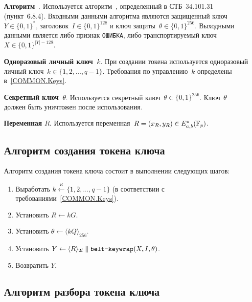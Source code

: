 {\bf Алгоритм~}.
Используется алгоритм~,
определенный в СТБ~34.101.31 (пункт~6.8.4).
Входными данными алгоритма являются
защищенный ключ~$Y\in\{0,1\}^*$,
заголовок~$I\in\{0,1\}^{128}$ 
и ключ защиты~$\theta\in\{0,1\}^{256}$.
%
Выходными данными является
либо признак \texttt{ОШИБКА}, 
либо транспортируемый ключ~$X\in\{0,1\}^{|Y|-128}$.

{\bf Одноразовый личный ключ~$k$}.
При создании токена используется одноразовый личный 
ключ~$k\in\{1,2,\ldots,q-1\}$.
Требования по управлению~$k$ определены в~\ref{COMMON.Keys}.

{\bf Секретный ключ~$\theta$}.
Используется секретный ключ~$\theta\in\{0,1\}^{256}$.
Ключ~$\theta$ должен быть уничтожен после использования.

{\bf Переменная $R$}.
Используется переменная~$R=(x_R,y_R)\in E_{a,b}^*(\mathbb{F}_p)$.

\subsection{Алгоритм создания токена ключа}\label{TRANSPORT.Wrap}

Алгоритм создания токена ключа состоит в выполнении следующих шагов:
\begin{enumerate}
\item
Выработать
$k\stackrel{R}{\leftarrow}\{1,2,\ldots,q-1\}$
(в соответствии с требованиями~\ref{COMMON.Keys}).

\item
Установить $R\leftarrow kG$.

\item
Установить $\theta\leftarrow\langle kQ\rangle_{256}$.

\item
Установить $Y\leftarrow \langle R\rangle_{2l}\parallel
\texttt{belt-keywrap}(X,I,\theta)$.

\item
Возвратить $Y$.
\end{enumerate}

\subsection{Алгоритм разбора токена ключа}\label{TRANSPORT.Unwrap}

